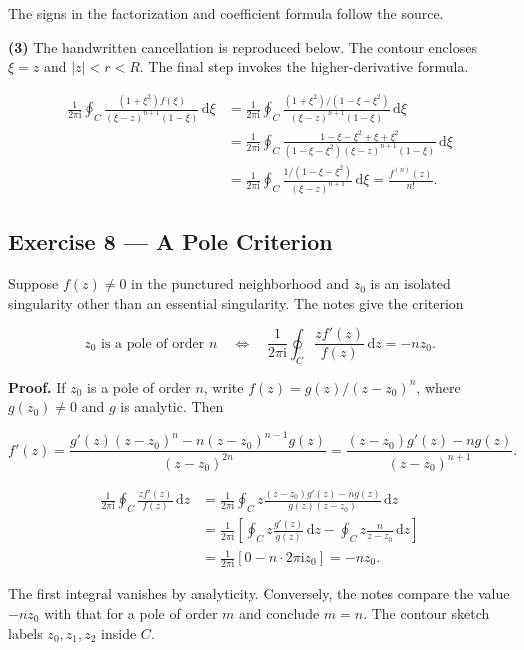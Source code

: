 \documentclass[11pt,a4paper]{article}
\theoremstyle{definition}
\theoremstyle{plain}
\begin{document}
The signs in the factorization and coefficient formula follow the source.

\textbf{(3)} The handwritten cancellation is reproduced below. The contour encloses $\xi=z$ and $|z|<r<R$. The final step invokes the higher-derivative formula.

\[
\begin{aligned}
\frac1{2\pi \mathrm{i}}\oint_C\frac{(1+\xi^2)f(\xi)}{(\xi-z)^{n+1}(1-\xi)}\,\mathrm{d}\xi
&=\frac1{2\pi \mathrm{i}}\oint_C
\frac{(1+\xi^2)/(1-\xi-\xi^2)}{(\xi-z)^{n+1}(1-\xi)}\,\mathrm{d}\xi\\
&=\frac1{2\pi \mathrm{i}}\oint_C
\frac{1-\xi-\xi^2+\xi+\xi^2}{(1-\xi-\xi^2)(\xi-z)^{n+1}(1-\xi)}\,\mathrm{d}\xi\\
&=\frac1{2\pi \mathrm{i}}\oint_C
\frac{1/(1-\xi-\xi^2)}{(\xi-z)^{n+1}}\,\mathrm{d}\xi
=\frac{f^{(n)}(z)}{n!}.
\end{aligned}
\]


\subsection{Exercise 8 --- A Pole Criterion}

Suppose $f(z)\ne0$ in the punctured neighborhood and $z_0$ is an isolated singularity other than an essential singularity. The notes give the criterion

\[
z_0\text{ is a pole of order }n
\quad\Longleftrightarrow\quad
\frac1{2\pi \mathrm{i}}\oint_C\frac{zf'(z)}{f(z)}\,\mathrm{d}z=-nz_0.
\]

\textbf{Proof.} If $z_0$ is a pole of order $n$, write $f(z)=g(z)/(z-z_0)^n$, where $g(z_0)\ne0$ and $g$ is analytic. Then

\[
f'(z)=\frac{g'(z)(z-z_0)^n-n(z-z_0)^{n-1}g(z)}{(z-z_0)^{2n}}
=\frac{(z-z_0)g'(z)-ng(z)}{(z-z_0)^{n+1}}.
\]

\[
\begin{aligned}
\frac1{2\pi \mathrm{i}}\oint_C\frac{zf'(z)}{f(z)}\,\mathrm{d}z
&=\frac1{2\pi \mathrm{i}}\oint_C z\frac{(z-z_0)g'(z)-ng(z)}{g(z)(z-z_0)}\,\mathrm{d}z\\
&=\frac1{2\pi \mathrm{i}}\left[\oint_C z\frac{g'(z)}{g(z)}\,\mathrm{d}z-
\oint_C z\frac n{z-z_0}\,\mathrm{d}z\right]\\
&=\frac1{2\pi \mathrm{i}}\left[0-n\cdot2\pi \mathrm{i} z_0\right]=-nz_0.
\end{aligned}
\]

The first integral vanishes by analyticity. Conversely, the notes compare the value $-nz_0$ with that for a pole of order $m$ and conclude $m=n$. The contour sketch labels $z_0,z_1,z_2$ inside $C$.
\end{document}
